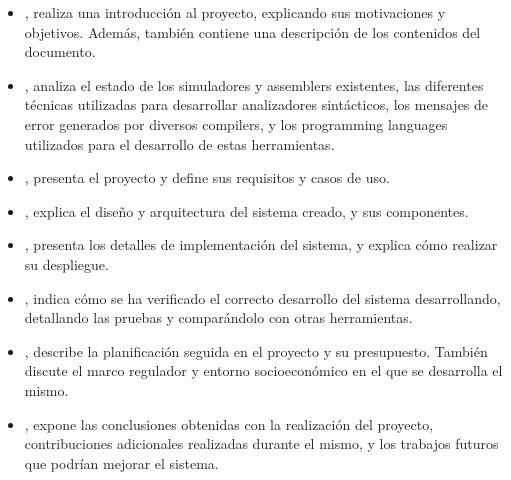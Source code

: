 \begin{itemize}
    \item {}, realiza una introducción al proyecto,
    explicando sus motivaciones y objetivos. Además, también contiene una
    descripción de los contenidos del documento.
    \item {}, analiza el estado de los simuladores y
    \glspl{assembler} existentes, las diferentes técnicas utilizadas para
    desarrollar analizadores sintácticos, los mensajes de error generados por
    diversos \glspl{compiler}, y los \glspl{programming language} utilizados
    para el desarrollo de estas herramientas.
    \item {}, presenta el proyecto y define sus requisitos y
    casos de uso.
    \item {}, explica el diseño y arquitectura del sistema
    creado, y sus componentes.
    \item {}, presenta los detalles de implementación
    del sistema, y explica cómo realizar su despliegue.
    \item {}, indica cómo se ha verificado el correcto
    desarrollo del sistema desarrollando, detallando las pruebas y comparándolo
    con otras herramientas.
    \item {}, describe la planificación seguida en el
    proyecto y su presupuesto. También discute el marco regulador y entorno
    socioeconómico en el que se desarrolla el mismo.
    \item {}, expone las conclusiones obtenidas con la
    realización del proyecto, contribuciones adicionales realizadas durante el
    mismo, y los trabajos futuros que podrían mejorar el sistema.
\end{itemize}
